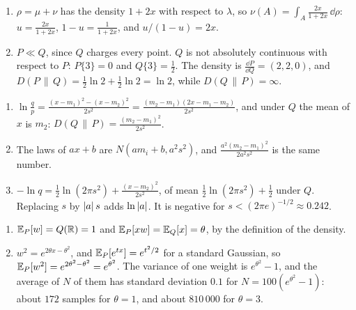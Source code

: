 \begin{enumerate}[nosep]
  \item $\rho = \mu + \nu$ has the density $1 + 2x$ with respect to
        $\lambda$, so $\nu(A) = \int_A\frac{2x}{1 + 2x}\,\dd\rho$:
        $u = \frac{2x}{1 + 2x}$, $1 - u = \frac1{1 + 2x}$, and
        $u/(1 - u) = 2x$.
  \item $P\ll Q$, since $Q$ charges every point. $Q$ is not absolutely
        continuous with respect to $P$: $P\{3\} = 0$ and
        $Q\{3\} = \frac12$. The density is
        $\frac{\dd P}{\dd Q} = (2, 2, 0)$, and
        $D(P\,\|\,Q) = \frac12\ln2 + \frac12\ln2 = \ln2$, while
        $D(Q\,\|\,P) = \infty$.
\end{enumerate}

\begin{enumerate}[nosep]
  \item $\ln\frac qp = \frac{(x - m_1)^2 - (x - m_2)^2}{2s^2}
        = \frac{(m_2 - m_1)(2x - m_1 - m_2)}{2s^2}$, and under $Q$ the
        mean of $x$ is $m_2$:
        $D(Q\,\|\,P) = \frac{(m_2 - m_1)^2}{2s^2}$.
  \item The laws of $ax + b$ are $N(am_i + b, a^2s^2)$, and
        $\frac{a^2(m_2 - m_1)^2}{2a^2s^2}$ is the same number.
  \item $-\ln q = \frac12\ln(2\pi s^2) + \frac{(x - m_2)^2}{2s^2}$, of
        mean $\frac12\ln(2\pi s^2) + \frac12$ under $Q$. Replacing $s$
        by $\left|a\right|s$ adds $\ln\left|a\right|$. It is negative for
        $s < (2\pi e)^{-1/2}\approx0.242$.
\end{enumerate}

\begin{enumerate}[nosep]
  \item $\mathbb{E}_P[w] = Q(\mathbb{R}) = 1$ and $\mathbb{E}_P[xw] = \mathbb{E}_Q[x] = \theta$, by the
        definition of the density.
  \item $w^2 = e^{2\theta x - \theta^2}$, and
        $\mathbb{E}_P[e^{tx}] = e^{t^2/2}$ for a standard Gaussian, so
        $\mathbb{E}_P[w^2] = e^{2\theta^2 - \theta^2} = e^{\theta^2}$. The
        variance of one weight is $e^{\theta^2} - 1$, and the average of
        $N$ of them has standard deviation $0.1$ for
        $N = 100(e^{\theta^2} - 1)$: about $172$ samples for
        $\theta = 1$, and about $810\,000$ for $\theta = 3$.
\end{enumerate}

